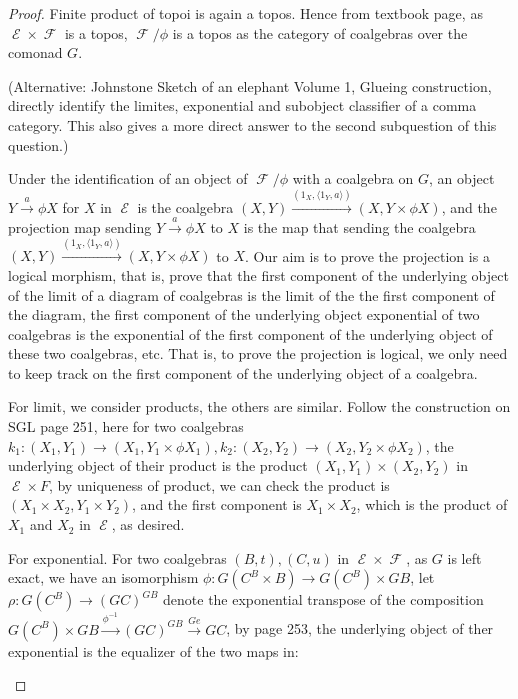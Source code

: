 \documentclass[a4paper]{article}
\DeclareMathOperator{\E}{\mathcal E}
\DeclareMathOperator{\F}{\mathcal F}
\begin{document}
\begin{proof}
    Finite product of topoi is again a topos. Hence from textbook page, as $\E\times \F$ is a topos, $\F/\phi$ is a topos as the category of coalgebras over the comonad $G$.

    (Alternative: Johnstone Sketch of an elephant Volume 1, Glueing construction, directly identify the limites, exponential and subobject classifier of a comma category. This also gives a more direct answer to the second subquestion of this question.)

    Under the identification of an object of $\F/\phi$ with a coalgebra on $G$, an object $Y\overset{a}\to \phi X$ for $X$ in $\E$ is the coalgebra $(X,Y)\overset{(1_X,\langle 1_Y,a\rangle)}\to (X,Y\times \phi X)$, and the projection map sending $Y\overset{a}\to \phi X$ to $X$ is the map that sending the coalgebra  $(X,Y)\overset{(1_X,\langle 1_Y,a\rangle)}\to (X,Y\times \phi X)$ to $X$. Our aim is to prove the projection is a logical morphism, that is, prove that the first component of the underlying object of the limit of a diagram of coalgebras is the limit of the the first component of the diagram, the first component of the underlying object exponential of two coalgebras is the exponential of the first component of the underlying object of these two coalgebras, etc. That is, to prove the projection is logical, we only need to keep track on the first component of the underlying object of a coalgebra.

    For limit, we consider products, the others are similar. Follow the construction on SGL page 251, here for two coalgebras $k_1:(X_1,Y_1)\to (X_1,Y_1\times \phi X_1),k_2:(X_2,Y_2)\to (X_2,Y_2\times \phi X_2)$, the underlying object of their product is the product $(X_1,Y_1)\times (X_2,Y_2)$ in $\E\times F$, by uniqueness of product, we can check the product is $(X_1\times X_2,Y_1\times Y_2)$, and the first component is $X_1\times X_2$, which is the product of $X_1$ and $X_2$ in $\E$, as desired.

    For exponential. For two coalgebras $(B,t),(C,u)$ in $\E\times \F$, as $G$ is left exact, we have an isomorphism $\phi:G(C^B\times B)\to G(C^B)\times GB$, let $\rho:G(C^B)\to (GC)^{GB}$ denote the exponential transpose of the composition $G(C^B)\times GB\overset{\phi^{-1}}\to (GC)^{GB}\overset{Ge}\to GC$, by page 253, the underlying object of ther exponential is the equalizer of the two maps in:

    \begin{center}
    \end{center}


\end{proof}
\end{document}
